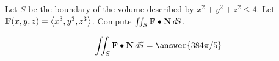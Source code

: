 \documentclass{ximera}
\author{David Guichard \and Neal Koblitz \and H. Jerome Keisler \and Albert Scheller \and Barry Balof \and Mike Wills \and Matthew Carr}
\begin{document}
\begin{exercise}




Let $S$ be the boundary of the volume described by $x^2+y^2+z^2\le 4$. Let $\mathbf{F}(x,y,z)=\left\langle x^3,y^3,z^3\right\rangle$. Compute $\iint_{S}\mathbf{F}\bullet\mathbf{N}\mathop{}\!d\! S$.

\begin{prompt}
\[
\iint_{S}\vec{F}\dotp\vec{N}\d S=\answer{384\pi/5}
\]
\end{prompt}


\end{exercise}
\end{document}

